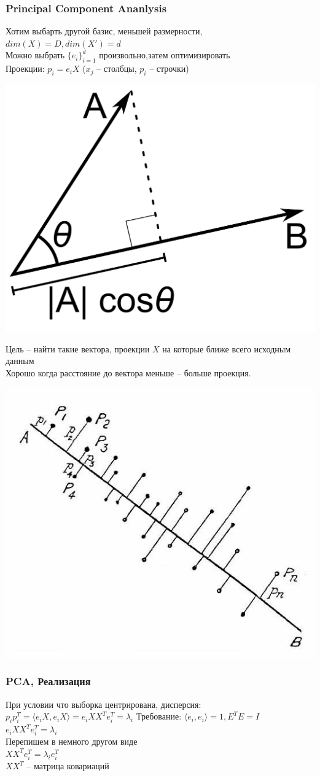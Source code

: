 \documentclass[14pt]{beamer}
\begin{document}
\begin{frame}
\frametitle{Principal Component Ananlysis}
	Хотим выбарть другой базис, меньшей размерности, $dim(X)=D, dim(X')=d$\\
	Можно выбрать $\{e_i\}_{i=1}^d$ произвольно,затем оптимизировать \\
	Проекции: $p_i=e_iX$ ($x_j$ -- столбцы, $p_i$ -- строчки)\\
	\begin{center}
  \includegraphics[width=0.4\linewidth]{project.png}\\
	\end{center}
\end{frame}
\begin{frame}
	Цель -- найти такие вектора, проекции $X$ на которые ближе всего исходным данным\\
	Хорошо когда расстояние до вектора меньше -- больше проекция.\\
	\begin{center}
	  \includegraphics[width=0.45\linewidth]{pearson.jpg}\\
	\end{center}
\end{frame}

\begin{frame}
\frametitle{PCA, Реализация}
	При условии что выборка центрирована, дисперсия: $ p_ip_i^T=\langle e_iX, e_iX \rangle=e_iXX^Te_i^T=\lambda_i$
	Требование: $\langle e_i,e_i \rangle =1 ,E^TE=I$\\
	$e_iXX^Te_i^T=\lambda_i$\\
	Перепишем в немного другом виде\\
	$XX^Te_i^T=\lambda_ie_i^T$\\
	$XX^T$ -- матрица ковариаций\\[1em]
\end{frame}
\end{document}
